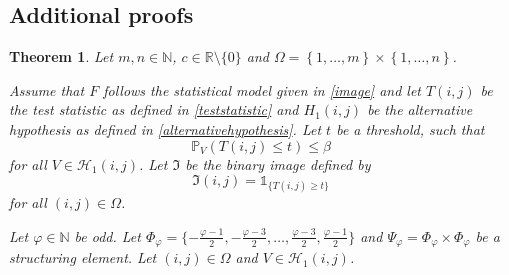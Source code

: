 \documentclass[a4paper,12pt]{article}
\theoremstyle{plain}
\newtheorem{theorem}{Theorem}[section]
\theoremstyle{definition}
\begin{document}
\begin{appendix}
	\section{Additional proofs}
	
	\begin{theorem}
		Let $m, n \in \mathbb{N}$, $c \in \mathbb{R} \setminus \{ 0 \}$ and $\Omega = \left\{ 1, \dots, m \right\} \times \left\{ 1, \dots, n \right\}$.
		
		Assume that $F$ follows the statistical model given in \eqref{image} and let $T(i, j)$ be the test statistic as defined in \eqref{teststatistic} and $H_1(i, j)$ be the alternative hypothesis as defined in \eqref{alternativehypothesis}. Let $t$ be a threshold, such that
		\begin{equation*}
			\mathbb{P}_V\left( T(i, j) \leq t \right) \leq \beta
		\end{equation*}
		for all $V \in \mathcal{H}_1(i, j)$. Let $\mathfrak{I}$ be the binary image defined by
		\begin{equation}
			\mathfrak{I}(i, j) = \mathds{1}_{ \{ T(i, j) \geq t \} }
		\end{equation}
		for all $(i, j) \in \Omega$.
		
		Let $\varphi \in \mathbb{N}$ be odd. Let $\Phi_\varphi = \{ -\frac{\varphi - 1}{2}, -\frac{\varphi - 3}{2}, \dots, \frac{\varphi - 3}{2}, \frac{\varphi - 1}{2} \}$ and $\Psi_\varphi = \Phi_\varphi \times \Phi_\varphi$ be a structuring element. Let $(i, j) \in \Omega$ and $V \in \mathcal{H}_1(i, j)$.
		

\end{theorem}
\end{appendix}
\end{document}
